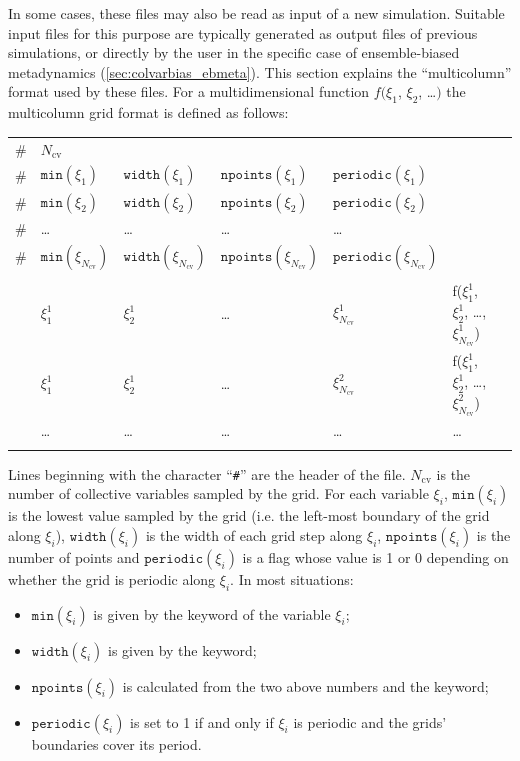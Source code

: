 In some cases, these files may also be read as input of a new simulation.
Suitable input files for this purpose are typically generated as output files of previous simulations, or directly by the user in the specific case of ensemble-biased metadynamics (\ref{sec:colvarbias_ebmeta}).
This section explains the ``multicolumn'' format used by these files.
For a multidimensional function $f(\xi_{1}$, $\xi_{2}$, \ldots $)$ the multicolumn grid format is defined as follows:\\

\begin{tabular}{l l l l l l l}
\# & $N_{\mathrm{cv}}$ & & & & \\
\# & $\mathtt{min}(\xi_{1})$ & $\mathtt{width}(\xi_{1})$ & $\mathtt{npoints}({\xi_{1}})$ & $\mathtt{periodic}({\xi_{1}})$ \\
\# & $\mathtt{min}(\xi_{2})$ & $\mathtt{width}(\xi_{2})$ & $\mathtt{npoints}({\xi_{2}})$ & $\mathtt{periodic}({\xi_{2}})$ \\
\# & \ldots & \ldots & \ldots & \ldots \\
\# & $\mathtt{min}(\xi_{N_{\mathrm{cv}}})$ & $\mathtt{width}(\xi_{N_{\mathrm{cv}}})$ & $\mathtt{npoints}({\xi_{N_{\mathrm{cv}}}})$ & $\mathtt{periodic}({\xi_{N_{\mathrm{cv}}}})$ & \\
\\
& $\xi^{1}_{1}$ & $\xi^{1}_{2}$ & \ldots & $\xi^{1}_{N_{\mathrm{cv}}}$ & f($\xi^{1}_{1}$, $\xi^{1}_{2}$, \ldots, $\xi^{1}_{N_{\mathrm{cv}}}$) & \\
& $\xi^{1}_{1}$ & $\xi^{1}_{2}$ & \ldots & $\xi^{2}_{N_{\mathrm{cv}}}$ & f($\xi^{1}_{1}$, $\xi^{1}_{2}$, \ldots, $\xi^{2}_{N_{\mathrm{cv}}}$) \\
& \ldots & \ldots & \ldots & \ldots & \ldots \\
\\
\end{tabular}

\noindent{}Lines beginning with the character ``\texttt{\#}'' are the header of the file.
$N_{\mathrm{cv}}$ is the number of collective variables sampled by the grid.
For each variable $\xi_{i}$, $\mathtt{min}(\xi_{i})$ is the lowest value sampled by the grid (i.e.{} the left-most boundary of the grid along $\xi_{i}$), $\mathtt{width}(\xi_{i})$ is the width of each grid step along $\xi_{i}$, $\mathtt{npoints}(\xi_{i})$ is the number of points and $\mathtt{periodic}(\xi_{i})$ is a flag whose value is 1 or 0 depending on whether the grid is periodic along $\xi_{i}$.
In most situations:
\begin{itemize}
\item $\mathtt{min}(\xi_{i})$ is given by the  keyword of the variable $\xi_{i}$;
\item $\mathtt{width}(\xi_{i})$ is given by the  keyword;
\item $\mathtt{npoints}(\xi_{i})$ is calculated from the two above numbers and the  keyword;
\item $\mathtt{periodic}(\xi_{i})$ is set to 1 if and only if $\xi_{i}$ is periodic and the grids' boundaries cover its period.
\end{itemize}

